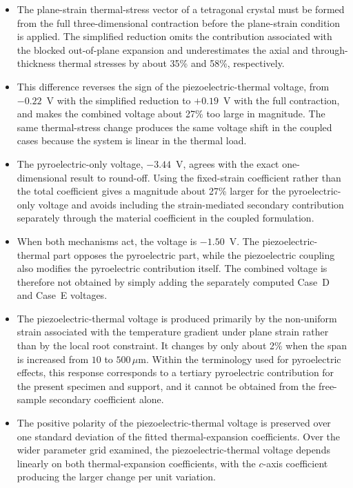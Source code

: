 \documentclass[pdflatex,sn-mathphys-num]{sn-jnl}
\begin{document}
\begin{itemize}
\item The plane-strain thermal-stress vector of a tetragonal crystal must be formed
from the full three-dimensional contraction before the plane-strain condition is
applied. The simplified reduction omits the contribution associated with the blocked
out-of-plane expansion and underestimates the axial and through-thickness thermal
stresses by about 35\% and 58\%, respectively.

\item This difference reverses the sign of the piezoelectric-thermal voltage, from
$-0.22$~V with the simplified reduction to $+0.19$~V with the full contraction, and
makes the combined voltage about 27\% too large in magnitude. The same thermal-stress
change produces the same voltage shift in the coupled cases because the system is
linear in the thermal load.

\item The pyroelectric-only voltage, $-3.44$~V, agrees with the exact one-dimensional
result to round-off. Using the fixed-strain coefficient rather than the total
coefficient gives a magnitude about 27\% larger for the pyroelectric-only voltage and
avoids including the strain-mediated secondary contribution separately through the
material coefficient in the coupled formulation.

\item When both mechanisms act, the voltage is $-1.50$~V. The piezoelectric-thermal
part opposes the pyroelectric part, while the piezoelectric coupling also modifies the
pyroelectric contribution itself. The combined voltage is therefore not obtained by
simply adding the separately computed Case~D and Case~E voltages.

\item The piezoelectric-thermal voltage is produced primarily by the non-uniform strain
associated with the temperature gradient under plane strain rather than by the local
root constraint. It changes by only about 2\% when the span is increased from
$10$ to $500\,\mu\text{m}$. Within the terminology used for pyroelectric effects, this
response corresponds to a tertiary pyroelectric contribution for the present specimen
and support, and it cannot be obtained from the free-sample secondary coefficient
alone.

\item The positive polarity of the piezoelectric-thermal voltage is preserved over one
standard deviation of the fitted thermal-expansion coefficients. Over the wider parameter grid examined, the piezoelectric-thermal voltage depends
linearly on both thermal-expansion coefficients, with the $c$-axis coefficient
producing the larger change per unit variation.
\end{itemize}
\end{document}
